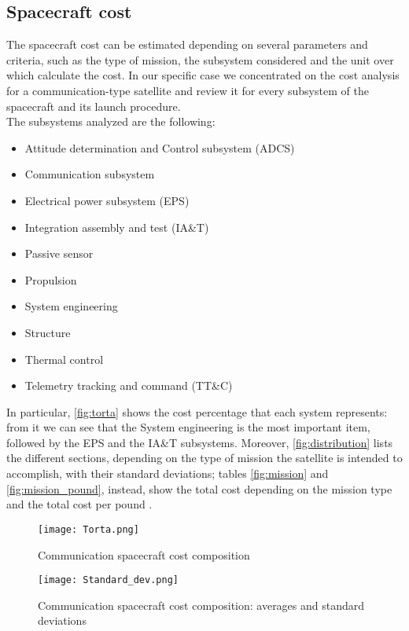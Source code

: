 \subsection{Spacecraft cost}
	The spacecraft cost can be estimated depending on several parameters and criteria, such as the type of mission, the subsystem considered and the unit over which calculate the cost. In our specific case we concentrated on the cost analysis for a communication-type satellite and review it for every subsystem of the spacecraft and its launch procedure.\\

	The subsystems analyzed  are the following:
	\begin{itemize}
		\item Attitude determination and Control subsystem (ADCS)
		\item Communication subsystem
		\item Electrical power subsystem (EPS)
		\item Integration assembly and test (IA\&T)
		\item Passive sensor
		\item Propulsion
		\item System engineering
		\item Structure
		\item Thermal control
		\item Telemetry tracking and command (TT\&C)
	\end{itemize}
	In particular, \autoref{fig:torta} shows the cost percentage that each system represents: from it we can see that the 				System engineering is the most important item, followed by the EPS and the IA\&T subsystems. Moreover, 						\autoref{fig:distribution} lists the different sections, depending on the type of mission the satellite is intended to 					accomplish, with their standard deviations; tables \ref{fig:mission} and \ref{fig:mission_pound}, instead, show the total cost depending on the mission type and the total cost per pound \cite{Fox2008}.

	\begin{figure}
		\centering
		\texttt{[image: Torta.png]}
		\caption{Communication spacecraft cost composition}
		\label{fig:torta}
	\end{figure}

	\begin{figure}
		\centering
		\texttt{[image: Standard\_dev.png]}
		\caption{Communication spacecraft cost composition: averages and standard deviations}
		\label{fig:distribution}
	\end{figure}

